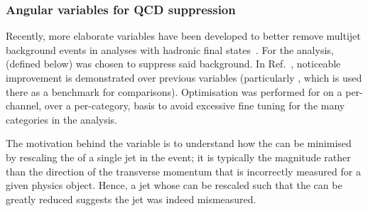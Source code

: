 

\subsubsection{Angular variables for QCD suppression}
\label{subsubsec:htoinv_ang_var_optimisation}

Recently, more elaborate variables have been developed to better remove multijet background events in analyses with hadronic final states~\cite{Sakuma:2018xrq}. For the analysis, \omegaTilde (defined below) was chosen to suppress said background. In Ref.~, noticeable improvement is demonstrated over previous variables (particularly \biasedDPhi, which is used there as a benchmark for comparisons). Optimisation was performed for \omegaTilde on a per-channel, over a per-category, basis to avoid excessive fine tuning for the many categories in the analysis.

The motivation behind the variable \omegaTilde is to understand how the \mht can be minimised by rescaling the \pt of a single \gls{jet} in the event; it is typically the magnitude rather than the direction of the transverse momentum that is incorrectly measured for a given physics object. Hence, a \gls{jet} whose \pt can be rescaled such that the \mht can be greatly reduced suggests the \gls{jet} was indeed mismeasured.

